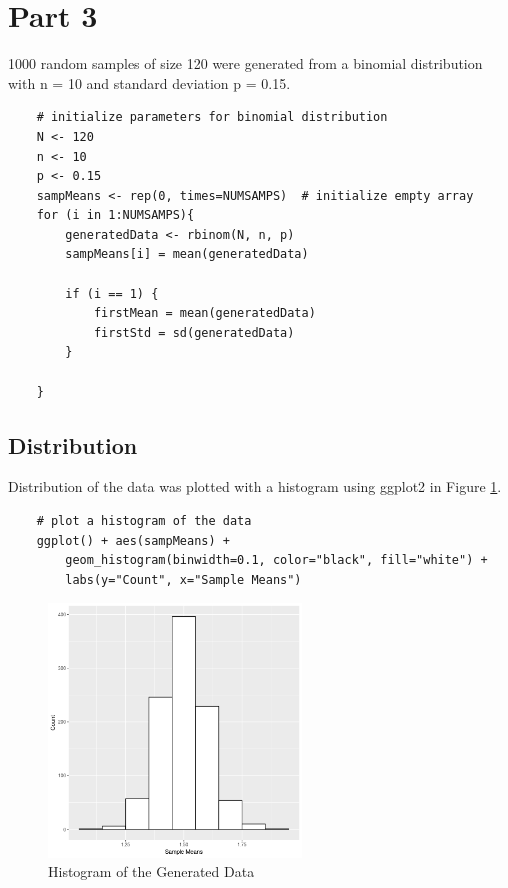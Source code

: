 \documentclass{article}
\begin{document}
    \section{Part 3}
        1000 random samples of size 120 were generated from a binomial distribution with n = 10 and standard deviation p = 0.15.

\begin{lstlisting}
    # initialize parameters for binomial distribution
    N <- 120
    n <- 10
    p <- 0.15
    sampMeans <- rep(0, times=NUMSAMPS)  # initialize empty array
    for (i in 1:NUMSAMPS){
        generatedData <- rbinom(N, n, p)
        sampMeans[i] = mean(generatedData)

        if (i == 1) {
            firstMean = mean(generatedData)
            firstStd = sd(generatedData)
        }

    }
\end{lstlisting}

        

        \subsection{Distribution}
            Distribution of the data was plotted with a histogram using ggplot2 in Figure \ref{fig:hist3}.
\begin{lstlisting}
    # plot a histogram of the data
    ggplot() + aes(sampMeans) + 
        geom_histogram(binwidth=0.1, color="black", fill="white") +
        labs(y="Count", x="Sample Means")
\end{lstlisting}

            \begin{figure}[h]
                \begin{center}
                    \includegraphics[width=0.6\textwidth]{figures/hist3.png}
                    \caption{Histogram of the Generated Data} \label{fig:hist3}
                \end{center}
            \end{figure}

    \clearpage
    \newpage
\end{document}
